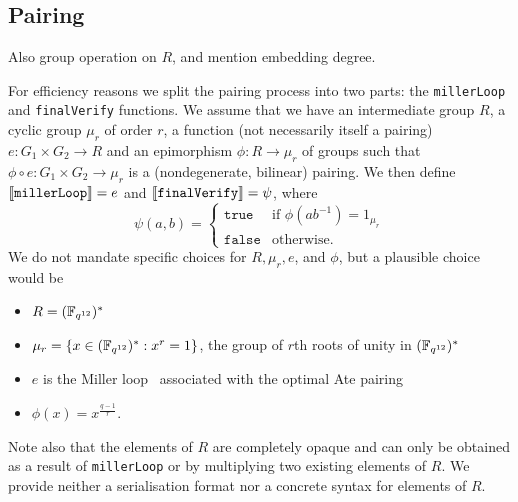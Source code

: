 \subsection{Pairing}
Also group operation on $R$, and mention embedding degree.

For efficiency reasons we split the pairing process into two parts:
the \texttt{millerLoop} and \texttt{finalVerify} functions.  We assume that we
have an intermediate group $R$, a cyclic group $\mu_r$ of order $r$, a function
(not necessarily itself a pairing) $e: G_1 \times G_2 \rightarrow R$ and an
epimorphism $\phi: R \rightarrow \mu_r$ of groups such that $\phi \circ e:
G_1 \times G_2 \rightarrow \mu_r$ is a (nondegenerate, bilinear) pairing.  We
then define $\llbracket\mathit{\mathtt{millerLoop}}\rrbracket = e$ and
$\llbracket\mathit{\mathtt{finalVerify}}\rrbracket = \psi$, where
$$
\psi(a,b) = \begin{cases}
               \mathtt{true} & \text{if $\phi(ab^{-1}) = 1_{\mu_r}$} \\
               \mathtt{false} & \text{otherwise.}
            \end{cases}
$$
We do not mandate specific choices for $R, \mu_r, e$, and $\phi$, but a
plausible choice would be
\begin{itemize}
\item $R = (\mathbb{F}_{q^{12}})^*$
\item $\mu_r = \{x \in (\mathbb{F}_{q^{12}})^*: x^r=1\}$, the group of $r$th roots of unity in $(\mathbb{F}_{q^{12}})^*$
\item $e$ is the Miller loop~\cite{Miller} associated with the optimal Ate pairing~\cite{Ate}
\item $\phi(x) = x^{\frac{q-1}{r}}$.
\end{itemize}

\noindent Note also that the elements of $R$ are completely opaque and can only be
obtained as a result of \texttt{millerLoop} or by multiplying two existing
elements of $R$.  We provide neither a serialisation format nor a concrete
syntax for elements of $R$.

